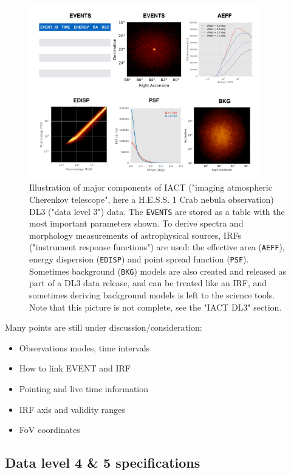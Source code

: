 \begin{figure}[tb]
\centerline{\includegraphics[width=0.9\textwidth]{figures/iact-dl3}}
\caption{
Illustration of major components of IACT ("imaging atmospheric Cherenkov telescope", here a H.E.S.S. 1 Crab nebula observation) DL3 ("data level 3") data. The \texttt{EVENTS} are stored as a table with the most important parameters shown. To derive spectra and morphology measurements of astrophysical sources, IRFs ("instrument response functions") are used: the effective area (\texttt{AEFF}), energy dispersion (\texttt{EDISP}) and point spread function (\texttt{PSF}). Sometimes background (\texttt{BKG}) models are also created and released as part of a DL3 data release, and can be treated like an IRF, and sometimes deriving background models is left to the science tools. Note that this picture is not complete, see the "IACT DL3" section.
}
\label{fig:iact-dl3}
\end{figure}

Many points are still under discussion/consideration:

\begin{itemize}
\item{}Observations modes, time intervals
\item{}How to link EVENT and IRF
\item{}Pointing and live time information
\item{}IRF axis and validity ranges
\item{}FoV coordinates
\end{itemize}

\subsection{Data level 4 \& 5 specifications}

